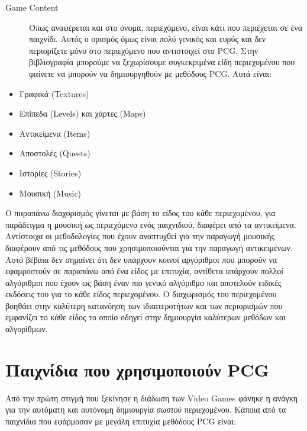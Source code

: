 \begin{description}
\item [Game Content] Όπως αναφέρεται και στο όνομα, περιεχόμενο, είναι κάτι που περιέχεται σε ένα παιχνίδι. Αυτός ο ορισμός όμως είναι πολύ γενικός και ευρύς και δεν περιορίζετε μόνο στο περιεχόμενο που αντιστοιχεί στο PCG. Στην βιβλιογραφία μπορούμε να ξεχωρίσουμε συγκεκριμένα είδη περιεχομένου που φαίνετε να μπορούν να δημιουργηθούν με μεθόδους PCG. Αυτά είναι:
\end{description}

\begin{itemize}
  \item Γραφικά (Textures)
  \item Επίπεδα (Levels) και χάρτες (Maps)
   \item Αντικείμενα (Items)
   \item Αποστολές (Quests)
   \item Ιστορίες (Stories)
   \item Μουσική (Music)
\end{itemize}

Ο παραπάνω διαχορισμός γίνεται με βάση το είδος του κάθε περιεχομένου, για παράδειγμα η μουσική ως περιεχόμενο ενός παιχνιδιού, διαφέρει από τα αντικείμενα. Αντίστοιχα οι μεθοδολογίες που έχουν αναπτυχθεί για την παραγωγή μουσικής διαφέρουν από τις μεθόδους που χρησιμοποιούνται για την παραγωγή αντικειμένων. Αυτό βέβαια δεν σημαίνει ότι δεν υπάρχουν κοινοί αργόριθμοι που μπορούν να εφαμροστούν σε παραπάνω από ένα είδος με επιτυχία, αντίθετα υπάρχουν πολλοί αλγόριθμοι που έχουν ως βάση έναν πιο γενικό αλγόριθμο και αποτελούν ειδικές εκδόσεις του για το κάθε είδος περιεχομένου. Ο διαχωρισμός του περιεχομένου βοηθάει στην καλύτερη κατανόηση των ιδιαιτεροτήτων και των περιορισμών που εμφανίζει το κάθε είδος το οποίο οδηγεί στην δημιουργία καλύτερων μεθόδων και αλγορίθμων.

\section{Παιχνίδια που χρησιμοποιούν PCG}

Από την πρώτη στιγμή που ξεκίνησε η διάδωση των Video Games φάνηκε η ανάγκη για την αυτόματη και αυτόνομη δημιουργία   \textit{σωστού} περιεχομένου. Κάποια από τα παιχνίδια που εφάρμοσαν με μεγάλη επιτυχία μεθόδους PCG είναι:

